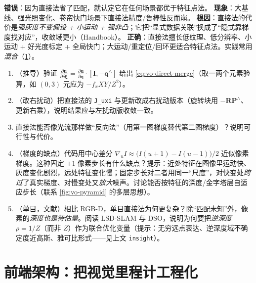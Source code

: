 \begin{pitfall}
\textbf{错误}：因为直接法省了匹配，就认定它在任何场景都优于特征点法。
\textbf{现象}：大基线、强光照变化、卷帘快门场景下直接法精度/鲁棒性反而崩。
\textbf{根因}：直接法的代价是\emph{强灰度不变假设 + 小运动 + 强非凸}；它把“显式数据关联”换成了“隐式靠梯度找对应”，收敛域更小（Handbook\cite{carlone2026handbook}）。
\textbf{正确}：直接法擅长低纹理、低分辨率、小运动 + 好光度标定 + 全局快门；大运动/重定位/回环更适合特征点法。实践常用\emph{混合}（\cref{sec:vo-frontend}）。
\end{pitfall}

\begin{practice}
\begin{enumerate}
  \item （推导）验证 $\frac{\partial\mathbf{u}}{\partial\delta\boldsymbol{\xi}}=\frac{\partial\mathbf{u}}{\partial\mathbf{q}}\cdot[\mathbf{I},-\mathbf{q}^\wedge]$ 给出 \cref{eq:vo-direct-merge}（取一两个元素验算，如 $(0,3)$ 元应为 $-f_xXY/Z^2$）。
  \item （改右扰动）把直接法的 \texttt{J\_uxi} 与更新改成右扰动版本（旋转块用 $-\mathbf{R}\mathbf{P}^\wedge$、更新右乘），说明结果应与左扰动版收敛一致。
  \item 直接法能否像光流那样做“反向法”（用第一图梯度替代第二图梯度）？说明可行性与代价。
  \item （梯度的缺点）代码用中心差分 $\nabla_u I\approx\big(I(u+1)-I(u-1)\big)/2$ 近似像素梯度。这种固定 $\pm1$ 像素步长有什么缺点？提示：近处特征在图像里运动快、灰度变化剧烈，远处特征变化慢；固定步长对二者用同一“尺度”，对快变处\emph{跨过}了真实梯度、对慢变处又\emph{放大}噪声。讨论能否按特征的深度/金字塔层自适应步长（联系 \cref{fig:vo-pyramid} 的多层思想）。
  \item （单目，文献）相比 RGB-D，单目直接法为何更复杂？除“匹配未知”外，像素的\emph{深度也是待估量}。阅读 LSD-SLAM\cite{engel2014lsd} 与 DSO\cite{engel2017dso}，说明为何要把\emph{逆深度} $\rho=1/Z$（而非 $Z$）作为联合优化变量（提示：无穷远点表达、逆深度域不确定度近高斯、雅可比形式——见上文 \texttt{insight}）。
\end{enumerate}
\end{practice}

\section{前端架构：把视觉里程计工程化}
\label{sec:vo-frontend}

